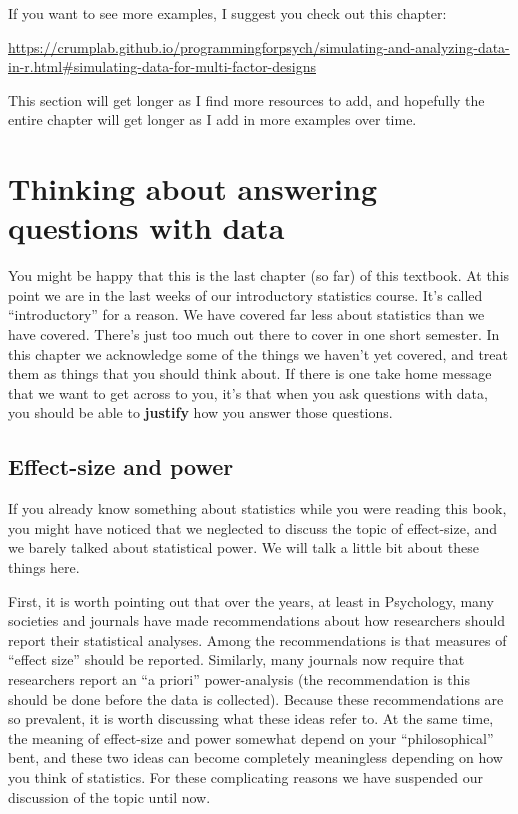 \documentclass[]{book}
\begin{document}
If you want to see more examples, I suggest you check out this chapter:

\url{https://crumplab.github.io/programmingforpsych/simulating-and-analyzing-data-in-r.html\#simulating-data-for-multi-factor-designs}

This section will get longer as I find more resources to add, and hopefully the entire chapter will get longer as I add in more examples over time.

\hypertarget{thinking-about-answering-questions-with-data}{%
\chapter{Thinking about answering questions with data}\label{thinking-about-answering-questions-with-data}}

You might be happy that this is the last chapter (so far) of this textbook. At this point we are in the last weeks of our introductory statistics course. It's called ``introductory'' for a reason. We have covered far less about statistics than we have covered. There's just too much out there to cover in one short semester. In this chapter we acknowledge some of the things we haven't yet covered, and treat them as things that you should think about. If there is one take home message that we want to get across to you, it's that when you ask questions with data, you should be able to \textbf{justify} how you answer those questions.

\hypertarget{effect-size-and-power}{%
\section{Effect-size and power}\label{effect-size-and-power}}

If you already know something about statistics while you were reading this book, you might have noticed that we neglected to discuss the topic of effect-size, and we barely talked about statistical power. We will talk a little bit about these things here.

First, it is worth pointing out that over the years, at least in Psychology, many societies and journals have made recommendations about how researchers should report their statistical analyses. Among the recommendations is that measures of ``effect size'' should be reported. Similarly, many journals now require that researchers report an ``a priori'' power-analysis (the recommendation is this should be done before the data is collected). Because these recommendations are so prevalent, it is worth discussing what these ideas refer to. At the same time, the meaning of effect-size and power somewhat depend on your ``philosophical'' bent, and these two ideas can become completely meaningless depending on how you think of statistics. For these complicating reasons we have suspended our discussion of the topic until now.
\end{document}
